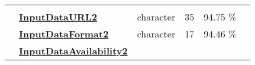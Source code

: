 \documentclass[]{article}
\begin{document}
\begin{longtable}[]{@{}lllrcl@{}}
\begin{minipage}[t]{0.12\columnwidth}
\end{minipage}\tabularnewline
\begin{minipage}[t]{0.07\columnwidth}\raggedright\strut
\strut
\end{minipage} & \begin{minipage}[t]{0.35\columnwidth}\raggedright\strut
\textbf{\protect\hyperlink{inputdataurl2}{InputDataURL2}}\strut
\end{minipage} & \begin{minipage}[t]{0.11\columnwidth}\raggedright\strut
character\strut
\end{minipage} & \begin{minipage}[t]{0.10\columnwidth}\raggedleft\strut
35\strut
\end{minipage} & \begin{minipage}[t]{0.10\columnwidth}\centering\strut
94.75 \%\strut
\end{minipage} & \begin{minipage}[t]{0.12\columnwidth}\raggedright\strut
\strut
\end{minipage}\tabularnewline
\begin{minipage}[t]{0.07\columnwidth}\raggedright\strut
\strut
\end{minipage} & \begin{minipage}[t]{0.35\columnwidth}\raggedright\strut
\textbf{\protect\hyperlink{inputdataformat2}{InputDataFormat2}}\strut
\end{minipage} & \begin{minipage}[t]{0.11\columnwidth}\raggedright\strut
character\strut
\end{minipage} & \begin{minipage}[t]{0.10\columnwidth}\raggedleft\strut
17\strut
\end{minipage} & \begin{minipage}[t]{0.10\columnwidth}\centering\strut
94.46 \%\strut
\end{minipage} & \begin{minipage}[t]{0.12\columnwidth}\raggedright\strut
\strut
\end{minipage}\tabularnewline
\begin{minipage}[t]{0.07\columnwidth}\raggedright\strut
\strut
\end{minipage} & \begin{minipage}[t]{0.35\columnwidth}\raggedright\strut
\textbf{\protect\hyperlink{inputdataavailability2}{InputDataAvailability2}}\strut
\end{minipage} & \begin{minipage}[t]{0.11\columnwidth}\raggedright\strut

\end{minipage}
\end{longtable}
\end{document}
